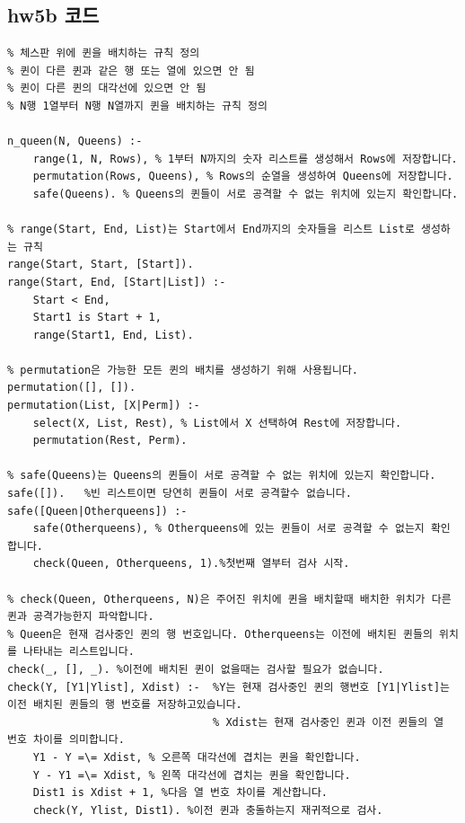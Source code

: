 \documentclass{article}
\begin{document}
\subsection{hw5b 코드}
\begin{verbatim}
% 체스판 위에 퀸을 배치하는 규칙 정의
% 퀸이 다른 퀸과 같은 행 또는 열에 있으면 안 됨
% 퀸이 다른 퀸의 대각선에 있으면 안 됨
% N행 1열부터 N행 N열까지 퀸을 배치하는 규칙 정의

n_queen(N, Queens) :- 
    range(1, N, Rows), % 1부터 N까지의 숫자 리스트를 생성해서 Rows에 저장합니다.
    permutation(Rows, Queens), % Rows의 순열을 생성하여 Queens에 저장합니다.
    safe(Queens). % Queens의 퀸들이 서로 공격할 수 없는 위치에 있는지 확인합니다.

% range(Start, End, List)는 Start에서 End까지의 숫자들을 리스트 List로 생성하는 규칙
range(Start, Start, [Start]).
range(Start, End, [Start|List]) :- 
    Start < End, 
    Start1 is Start + 1, 
    range(Start1, End, List).

% permutation은 가능한 모든 퀸의 배치를 생성하기 위해 사용됩니다.
permutation([], []).
permutation(List, [X|Perm]) :- 
    select(X, List, Rest), % List에서 X 선택하여 Rest에 저장합니다.
    permutation(Rest, Perm).

% safe(Queens)는 Queens의 퀸들이 서로 공격할 수 없는 위치에 있는지 확인합니다.
safe([]).   %빈 리스트이면 당연히 퀸들이 서로 공격할수 없습니다.
safe([Queen|Otherqueens]) :- 
    safe(Otherqueens), % Otherqueens에 있는 퀸들이 서로 공격할 수 없는지 확인합니다.
    check(Queen, Otherqueens, 1).%첫번째 열부터 검사 시작.

% check(Queen, Otherqueens, N)은 주어진 위치에 퀸을 배치할때 배치한 위치가 다른 퀸과 공격가능한지 파악합니다.
% Queen은 현재 검사중인 퀸의 행 번호입니다. Otherqueens는 이전에 배치된 퀸들의 위치를 나타내는 리스트입니다.
check(_, [], _). %이전에 배치된 퀸이 없을때는 검사할 필요가 없습니다.
check(Y, [Y1|Ylist], Xdist) :-  %Y는 현재 검사중인 퀸의 행번호 [Y1|Ylist]는 이전 배치된 퀸들의 행 번호를 저장하고있습니다. 
                                % Xdist는 현재 검사중인 퀸과 이전 퀸들의 열 번호 차이를 의미합니다.
    Y1 - Y =\= Xdist, % 오른쪽 대각선에 겹치는 퀸을 확인합니다.
    Y - Y1 =\= Xdist, % 왼쪽 대각선에 겹치는 퀸을 확인합니다.
    Dist1 is Xdist + 1, %다음 열 번호 차이를 계산합니다.
    check(Y, Ylist, Dist1). %이전 퀸과 충돌하는지 재귀적으로 검사.

\end{verbatim}
\end{document}
